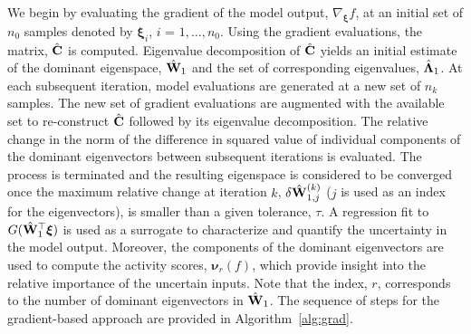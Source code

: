 We begin by evaluating the gradient of the model output, $\nabla_{\bm{\xi}}f$,
at an initial set of $n_0$ samples denoted by $\bm{\xi}_i$, $i$ = $1,\ldots,n_0$.
Using the gradient
evaluations, the matrix, $\hat{\mathbf{{C}}}$ is computed. Eigenvalue decomposition
of $\hat{\mathbf{{C}}}$ yields an initial estimate of the dominant eigenspace,
$\hat{\mathbf{{W}}}_1$ and the set of corresponding eigenvalues, 
$\hat{\mathbf{{\Lambda}}}_1$.
 At each subsequent iteration, model evaluations are
generated at a new set of $n_k$ samples. The new set of gradient evaluations
are augmented with the available set to re-construct $\hat{\mathbf{{C}}}$ followed
by its eigenvalue decomposition. The relative change in the norm of the
difference in squared value of individual components of the dominant
eigenvectors between subsequent iterations is evaluated. The process is
terminated and the resulting eigenspace is considered to be converged once
the maximum relative change at iteration $k$, $\delta \hat{\mathbf{{W}}}_{1,j}^{(k)}$
($j$ is used as an index for the eigenvectors),
is smaller than a given tolerance, $\tau$.  A regression fit to
$G(\hat{\mathbf{{W}}}_1^\top\bm{\xi})$ is used as a surrogate to characterize and
quantify the uncertainty in the model output. Moreover, the components of the
dominant eigenvectors are used to compute the activity scores, $\bm{\nu}_r(f)$,
which provide insight into the relative importance of the uncertain inputs.
Note that the index, $r$, corresponds to the number of dominant eigenvectors in
$\hat{\mathbf{{W}}}_1$. The sequence of steps for the gradient-based approach are
provided in Algorithm~\ref{alg:grad}.


